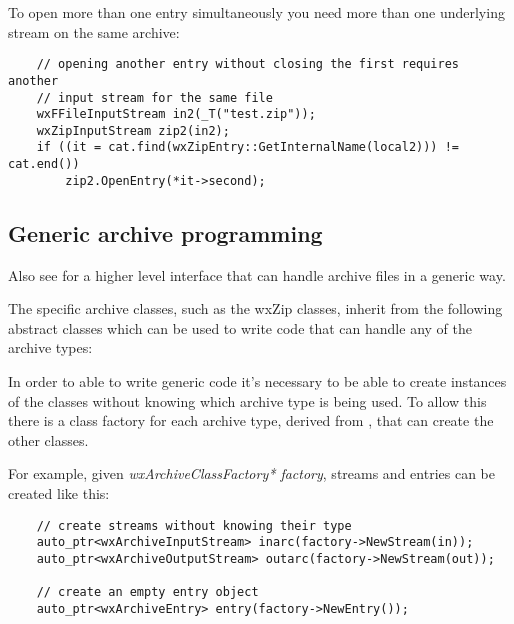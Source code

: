 To open more than one entry simultaneously you need more than one
underlying stream on the same archive:

\begin{verbatim}
    // opening another entry without closing the first requires another
    // input stream for the same file
    wxFFileInputStream in2(_T("test.zip"));
    wxZipInputStream zip2(in2);
    if ((it = cat.find(wxZipEntry::GetInternalName(local2))) != cat.end())
        zip2.OpenEntry(*it->second);

\end{verbatim}


\subsection{Generic archive programming}\label{wxarcgeneric}


Also see  for a higher level interface that
can handle archive files in a generic way.

The specific archive classes, such as the wxZip classes, inherit from
the following abstract classes which can be used to write code that can
handle any of the archive types:

\begin{twocollist}\twocolwidtha{5cm}
\end{twocollist}

In order to able to write generic code it's necessary to be able to create
instances of the classes without knowing which archive type is being used.
To allow this there is a class factory for each archive type, derived from
 , that can create
the other classes.

For example, given {\it wxArchiveClassFactory* factory}, streams and
entries can be created like this:

\begin{verbatim}
    // create streams without knowing their type
    auto_ptr<wxArchiveInputStream> inarc(factory->NewStream(in));
    auto_ptr<wxArchiveOutputStream> outarc(factory->NewStream(out));

    // create an empty entry object
    auto_ptr<wxArchiveEntry> entry(factory->NewEntry());

\end{verbatim}


